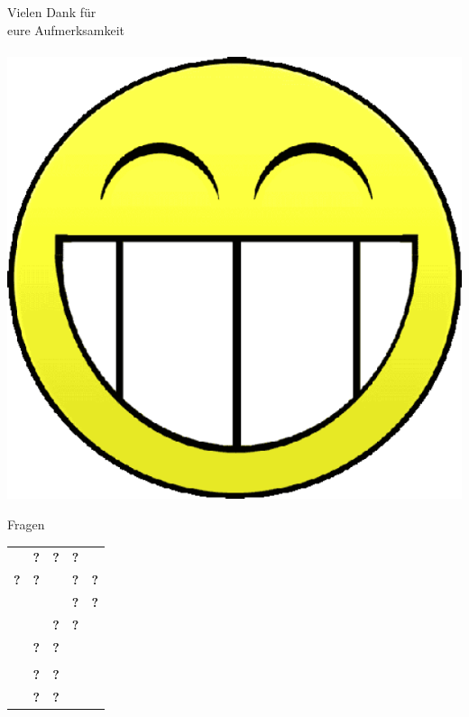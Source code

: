 \documentclass{beamer}
\begin{document}
\begin{frame}{}
  \begin{center}
    \begin{LARGE}
      Vielen Dank für\\
      eure Aufmerksamkeit\\
      ~\\
      \includegraphics[scale=0.2]{pic/smilie.png}
    \end{LARGE}
  \end{center}
\end{frame}

\begin{frame}{Fragen}
  \begin{center}
    \begin{LARGE}
      \begin{tabular}{ccccc}
         & \textbf{?} & \textbf{?} & \textbf{?} & \\
        \textbf{?} & \textbf{?} &  & \textbf{?} & \textbf{?}\\
         &  &  & \textbf{?} & \textbf{?}\\
         &  & \textbf{?} & \textbf{?} & \\
         & \textbf{?} & \textbf{?} &  & \\
         &  &  &  & \\
         & \textbf{?} & \textbf{?} &  & \\
         & \textbf{?} & \textbf{?} &  & 
      \end{tabular}
    \end{LARGE}
  \end{center}
\end{frame}
\end{document}
